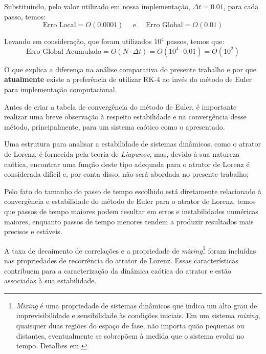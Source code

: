 \documentclass[12pt, a4paper]{article}
\begin{document}
    Substituindo, pelo valor utilizado em nossa implementação, $\Delta t = 0.01$, para cada passo, temos:
    \begin{equation*}
        \text{Erro Local} = O(0.0001) \quad \text{ e } \quad \text{Erro Global} = O(0.01) 
    \end{equation*}
    
    Levando em consideração, que foram utilizados $10^4$ passos, temos que:
    \begin{equation*}
        \text{Erro Global Acumulado} = O(N \cdot \Delta t) = O(10^4 \cdot 0.01) = O(10^2)
    \end{equation*}
    
    O que explica a diferença na análise comparativa do presente trabalho e por que \textbf{atualmente} existe a preferência de utilizar RK-4 ao invés do método de Euler para implementação computacional. 
    
    Antes de criar a tabela de convergência do método de Euler, é importante realizar uma breve observação à respeito estabilidade e na convergência desse método, principalmente, para um sistema caótico como o apresentado.
    
    Uma estrutura para analisar a estabilidade de sistemas dinâmicos, como o atrator de Lorenz, é fornecida pela teoria de \textit{Liapunov}, mas, devido à sua natureza caótica, encontrar uma função deste tipo adequada para o atrator de Lorenz é considerada difícil e, por conta disso, não será abordada no presente trabalho;
    
    Pelo fato do tamanho do passo de tempo escolhido está diretamente relacionado à convergência e estabilidade do método de Euler para o atrator de Lorenz, temos que passos de tempo maiores podem resultar em erros e instabilidades numéricas maiores, enquanto passos de tempo menores tendem a produzir resultados mais precisos e estáveis.
    
    A taxa de decaimento de correlações e a propriedade de \textit{mixing}\footnote{\textit{Mixing} é uma propriedade de sistemas dinâmicos que indica um alto grau de imprevisibilidade e sensibilidade às condições iniciais. Em um sistema \textit{mixing}, quaisquer duas regiões do espaço de fase, não importa quão pequenas ou distantes, eventualmente se sobrepõem à medida que o sistema evolui no tempo. Detalhes em \cite{Luzzatto2004}} foram incluídas nas propriedades de recorrência do atrator de Lorenz. Essas características contribuem para a caracterização da dinâmica caótica do atrator e estão associadas à sua estabilidade.
    
\end{document}
